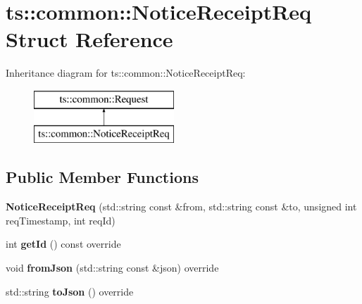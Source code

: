 \hypertarget{structts_1_1common_1_1_notice_receipt_req}{}\section{ts\+:\+:common\+:\+:Notice\+Receipt\+Req Struct Reference}
\label{structts_1_1common_1_1_notice_receipt_req}
Inheritance diagram for ts\+:\+:common\+:\+:Notice\+Receipt\+Req\+:\begin{figure}[H]
\begin{center}
\leavevmode
\includegraphics[height=2.000000cm]{structts_1_1common_1_1_notice_receipt_req}
\end{center}
\end{figure}
\subsection*{Public Member Functions}
\begin{DoxyCompactItemize}
\item 
\mbox{\label{structts_1_1common_1_1_notice_receipt_req_ae3a269817ffc1f31bc2f86dba3c39c87}} 
{\bfseries Notice\+Receipt\+Req} (std\+::string const \&from, std\+::string const \&to, unsigned int req\+Timestamp, int req\+Id)
\item 
\mbox{\label{structts_1_1common_1_1_notice_receipt_req_a4b2e55b26d5c4ed005d787369afc8622}} 
int {\bfseries get\+Id} () const override
\item 
\mbox{\label{structts_1_1common_1_1_notice_receipt_req_a5b4cde4c42fc619e4a540754d6517998}} 
void {\bfseries from\+Json} (std\+::string const \&json) override
\item 
\mbox{\label{structts_1_1common_1_1_notice_receipt_req_ab463957c39288f188e569178dce17e8a}} 
std\+::string {\bfseries to\+Json} () override
\end{DoxyCompactItemize}
